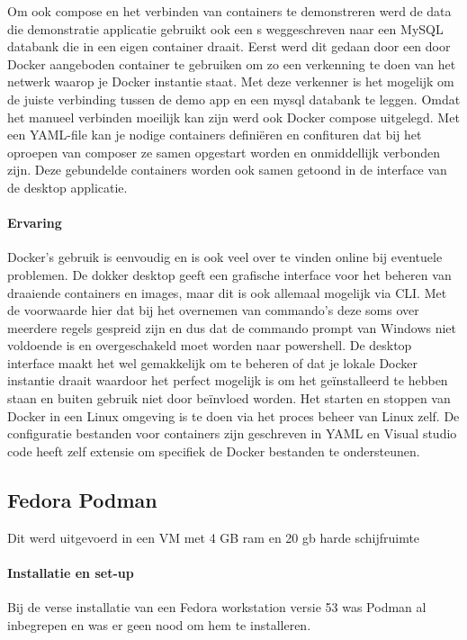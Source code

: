 \begin{itemize}
Om ook compose en het verbinden van containers te demonstreren werd de data die demonstratie applicatie gebruikt ook een s weggeschreven naar een MySQL databank die in een eigen container draait. Eerst werd dit gedaan door een door Docker aangeboden container te gebruiken om zo een verkenning te doen van het netwerk waarop je Docker instantie staat. Met deze verkenner is het mogelijk om de juiste verbinding tussen de demo app en een mysql databank te leggen. Omdat het manueel verbinden moeilijk kan zijn werd ook Docker compose uitgelegd. Met een YAML-file kan je nodige containers definiëren en confituren dat bij het oproepen van composer ze samen opgestart worden en onmiddellijk verbonden zijn. Deze gebundelde containers worden ook samen getoond in de interface van de desktop applicatie.

\paragraph{Ervaring}
Docker’s gebruik is eenvoudig en is ook veel over te vinden online bij eventuele problemen.  De dokker desktop geeft een grafische interface voor het beheren van draaiende containers en images, maar dit is ook allemaal mogelijk via CLI. Met de voorwaarde hier dat bij het overnemen van commando’s deze soms over meerdere regels gespreid zijn en dus dat de commando prompt van Windows niet voldoende is en overgeschakeld moet worden naar powershell.  De desktop interface maakt het wel gemakkelijk om te beheren of dat je lokale Docker instantie draait waardoor het perfect mogelijk is om het geïnstalleerd te hebben staan en buiten gebruik niet door beïnvloed worden. Het starten en stoppen van Docker in een Linux omgeving is te doen via het proces beheer van Linux zelf.  De configuratie bestanden voor containers zijn geschreven in YAML en Visual studio code heeft zelf extensie om specifiek de Docker bestanden te ondersteunen.

\subsection{Fedora Podman}
Dit werd uitgevoerd in een VM met 4 GB ram en 20 gb harde schijfruimte
\paragraph{Installatie en set-up}
Bij de verse installatie van een Fedora workstation versie 53 was Podman al inbegrepen en was er geen nood om hem te installeren.


\end{itemize}
